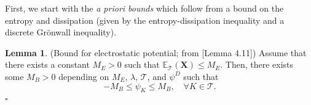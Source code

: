 \documentclass[10pt,a4paper, final]{article}
\newcommand*{\QEDB}{\null\nobreak\hfill\ensuremath{\square}}%
\theoremstyle{definition}								%
\newtheorem{lemma}[theorem]{Lemma}					%
\numberwithin{equation}{section}
\numberwithin{figure}{section}
\numberwithin{theorem}{section}
\begin{document}
First, we start with the \textit{a priori bounds} which follow from a bound on the entropy and dissipation (given by the entropy-dissipation inequality and a discrete Grönwall inequality).

\begin{lemma}(Bound for electrostatic potential; from \cite{Abdel2024Thesis}[Lemma 4.11]) \label{lem.bounds.psi}
    Assume that there exists a constant $M_E>0$ such that ${\mathbb E}_\mathcal{T}(\mathbf{X})\leq M_E$.
    Then, there exists some $M_B>0$ depending on $M_E$, $\lambda$, $\mathcal{T}$, and $\psi^D$ such that
    \begin{equation}\label{bounds.psi}
        -M_B \leq \psi_K  \leq M_B, \quad \forall K\in\mathcal{T}.
    \end{equation}
    \QEDB
\end{lemma}
\end{document}
